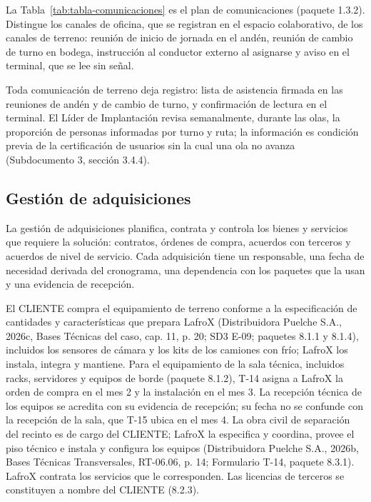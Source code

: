 \documentclass[carta,firma,final]{lafrox}
\begin{document}
La Tabla~\ref{tab:tabla-comunicaciones} es el plan de comunicaciones (paquete 1.3.2). Distingue los canales de oficina, que se registran en el espacio colaborativo, de los canales de terreno: reunión de inicio de jornada en el andén, reunión de cambio de turno en bodega, instrucción al conductor externo al asignarse y aviso en el terminal, que se lee sin señal.


Toda comunicación de terreno deja registro: lista de asistencia firmada en las reuniones de andén y de cambio de turno, y confirmación de lectura en el terminal. El Líder de Implantación revisa semanalmente, durante las olas, la proporción de personas informadas por turno y ruta; la información es condición previa de la certificación de usuarios sin la cual una ola no avanza (Subdocumento 3, sección 3.4.4).

\subsection{Gestión de adquisiciones}

La gestión de adquisiciones planifica, contrata y controla los bienes y servicios que requiere la solución: contratos, órdenes de compra, acuerdos con terceros y acuerdos de nivel de servicio. Cada adquisición tiene un responsable, una fecha de necesidad derivada del cronograma, una dependencia con los paquetes que la usan y una evidencia de recepción.

El CLIENTE compra el equipamiento de terreno conforme a la especificación de cantidades y características que prepara LafroX (Distribuidora Puelche S.A., 2026c, Bases Técnicas del caso, cap. 11, p. 20; SD3 E-09; paquetes 8.1.1 y 8.1.4), incluidos los sensores de cámara y los kits de los camiones con frío; LafroX los instala, integra y mantiene. Para el equipamiento de la sala técnica, incluidos racks, servidores y equipos de borde (paquete 8.1.2), T-14 asigna a LafroX la orden de compra en el mes 2 y la instalación en el mes 3. La recepción técnica de los equipos se acredita con su evidencia de recepción; su fecha no se confunde con la recepción de la sala, que T-15 ubica en el mes 4. La obra civil de separación del recinto es de cargo del CLIENTE; LafroX la especifica y coordina, provee el piso técnico e instala y configura los equipos (Distribuidora Puelche S.A., 2026b, Bases Técnicas Transversales, RT-06.06, p. 14; Formulario T-14, paquete 8.3.1). LafroX contrata los servicios que le corresponden. Las licencias de terceros se constituyen a nombre del CLIENTE (8.2.3).
\end{document}
